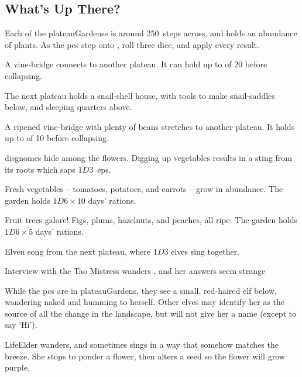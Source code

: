 \begin{multicols}{2}

\subsection{What's Up There?}

Each of the \glspl{plateauGardens} is around 250~\glspl{step} across, and holds an abundance of plants.
As the \glspl{pc} step onto , roll three dice, and apply every result.

\begin{dlist}
  \item
  A vine-bridge connects to another plateau.
  It can hold up to  of 20 before collapsing.
  
  The next plateau holds a snail-shell house, with tools to make snail-saddles below, and sleeping quarters above.
  \item
  A ripened vine-bridge with plenty of beans stretches to another plateau.
  It holds up to  of 10 before collapsing.
  \item
  \Glspl{disgnome} hide among the flowers.
  Digging up vegetables results in a sting from its roots which saps $1D3$~\glspl{ep}.
  \item
  Fresh vegetables -- tomatoes, potatoes, and carrots -- grow in abundance.
  The garden holds $1D6 \times 10$ days' \glspl{ration}.
  \item
  Fruit trees galore!
  Figs, plums, hazelnuts, and peaches, all ripe.
  The garden holds $1D6 \times 5$ days' \glspl{ration}.
  \item
  Elven song from the next plateau, where $1D3$ elves sing together.
\end{dlist}


{Interview with the Tao Mistress}%
{ wanders , and her answers seem strange}%

While the \glspl{pc} are in \gls{plateauGardens}, they see a small, red-haired elf below, wandering naked and humming to herself.
Other elves may identify her as the source of all the change in the landscape, but will not give her a name (except to say `Hi').

\Gls{LifeElder} wanders, and sometimes sings in a way that somehow matches the breeze.
She stops to ponder a flower, then alters a seed so the flower will grow purple.


\end{multicols}
